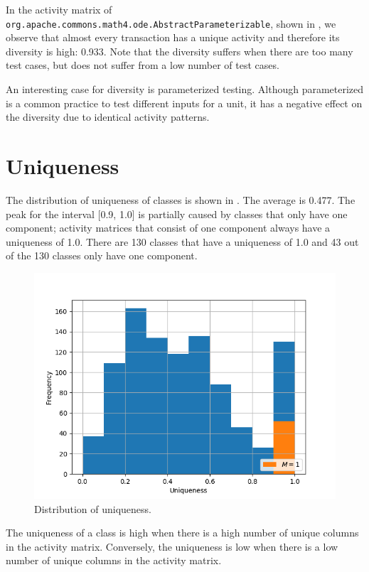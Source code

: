 \documentclass[twoside,a4paper,11pt]{memoir}
\begin{document}
In the activity matrix of \texttt{org.\-apache.\-commons.\-math4.\-ode.\-Abstract\-Parameterizable}, shown in , we observe that almost every transaction has a unique activity and therefore its diversity is high: 0.933.
Note that the diversity suffers when there are too many test cases, but does not suffer from a low number of test cases.

An interesting case for diversity is parameterized testing.
Although parameterized is a common practice to test different inputs for a unit, it has a negative effect on the diversity due to identical activity patterns.

\section{Uniqueness}

The distribution of uniqueness of classes is shown in .
The average is 0.477.
The peak for the interval [0.9, 1.0] is partially caused by classes that only have one component; activity matrices that consist of one component always have a uniqueness of 1.0.
There are 130 classes that have a uniqueness of 1.0 and 43 out of the 130 classes only have one component.

\begin{figure}
    \centering
    \includegraphics[width=\linewidth]{figures/histogram_uniqueness}
    \caption{Distribution of uniqueness.}
    \label{fig:uniqueness}
\end{figure}

The uniqueness of a class is high when there is a high number of unique columns in the activity matrix.
Conversely, the uniqueness is low when there is a low number of unique columns in the activity matrix.
\end{document}
